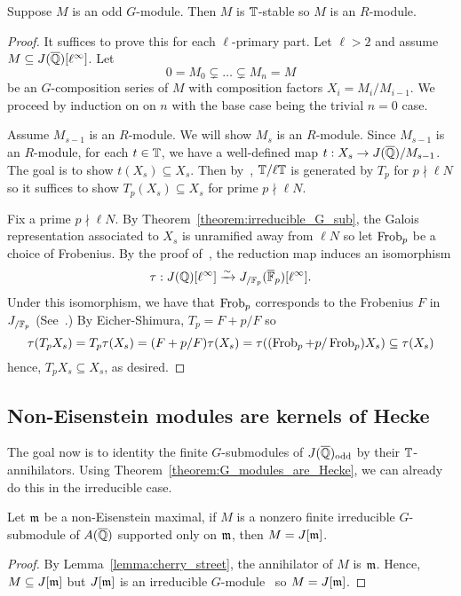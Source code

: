 \documentclass{article}
\newcommand{\odd}{\mathrm{odd}}
\begin{document}
\begin{theorem}\label{theorem:G_modules_are_Hecke}
    Suppose $M$ is an odd $G$-module. Then $M$ is $\mathbb{T}$-stable so $M$ is
    an $R$-module.
\end{theorem}
\begin{proof}
    It suffices to prove this for each $\ell$-primary part. Let $\ell>2$ and
    assume $M\subseteq J(\overline{\mathbb{Q}})[\ell^\infty]$. Let
    \[
        0 = M_0 \subsetneq \ldots \subsetneq M_n = M
    \]
    be an $G$-composition series of $M$ with composition factors $X_i =
    M_i/M_{i-1}$. We proceed by induction on on $n$ with the base
    case being the trivial $n=0$ case. 
    
    Assume $M_{s-1}$ is an $R$-module. We will show $M_s$ is an $R$-module.
    Since $M_{s-1}$ is an $R$-module, for each $t\in \mathbb{T}$, we have a
    well-defined map $t:X_s\to J(\overline{\mathbb{Q}})/M_{s-1}$. The goal is to show
    $t(X_s)\subseteq X_s$. Then by~\cite[Proposition 2]{ribet:mult_p_finite},
    $\mathbb{T}/\ell \mathbb{T}$ is generated by $T_p$ for $p\nmid \ell N$ so it suffices to
    show $T_p(X_s)\subseteq X_s$ for prime $p\nmid \ell N$.

    Fix a prime $p\nmid \ell N$. By Theorem~\ref{theorem:irreducible_G_sub},
    the Galois representation associated to $X_s$ is unramified away from $\ell
    N$ so let $\operatorname{Frob}_p$ be a choice of Frobenius. By the proof of~\cite[Lemma
    12.6.2]{ribet-stein:mod}, the reduction map induces an isomorphism
    \[
        \tau:J(\mathbb{Q})[\ell^\infty] \xrightarrow{\sim} J_{/\mathbb{F}_p} (\overline{\mathbb{F}}_p)[\ell^\infty].
    \]
    Under this isomorphism, we have that $\operatorname{Frob}_p$ corresponds to the Frobenius
    $F$ in $J_{/\mathbb{F}_p}$ (See~\cite[\S 5.3]{ribet-stein:serre}.) By
    Eicher-Shimura, $T_p = F+p/F$ so
    \[
    \tau(T_p X_s) 
    = T_p\tau(X_s) 
    = (F+p/F)\tau(X_s)
    = \tau((\operatorname{Frob}_p+p/\operatorname{Frob}_p)X_s)
    \subseteq \tau(X_s)
    \]
    hence, $T_p X_s\subseteq X_s$, as desired.
\end{proof}



\subsection{Non-Eisenstein modules are kernels of Hecke}%
\label{sub:non_eisenstein_modules_are_kernels_of_hecke}


The goal now is to identity the finite $G$-submodules of $J(\QQbar)_\odd$ by
their $\mathbb{T}$-annihilators. Using Theorem~\ref{theorem:G_modules_are_Hecke}, we
can already do this in the irreducible case.
\begin{corollary}
    Let $\mathfrak{m}$ be a non-Eisenstein maximal, if $M$ is a nonzero finite irreducible
    $G$-submodule of $A(\overline{\mathbb{Q}})$ supported only on $\mathfrak{m}$, then $M=J[\mathfrak{m}]$.
\end{corollary}
\begin{proof}
    By Lemma~\ref{lemma:cherry_street}, the annihilator of $M$ is $\mathfrak{m}$. Hence,
    $M\subseteq J[\mathfrak{m}]$ but $J[\mathfrak{m}]$ is an irreducible
    $G$-module~\cite[Proposition 14.2]{mazur:eisenstein} so $M=J[\mathfrak{m}]$.
\end{proof}
\end{document}
